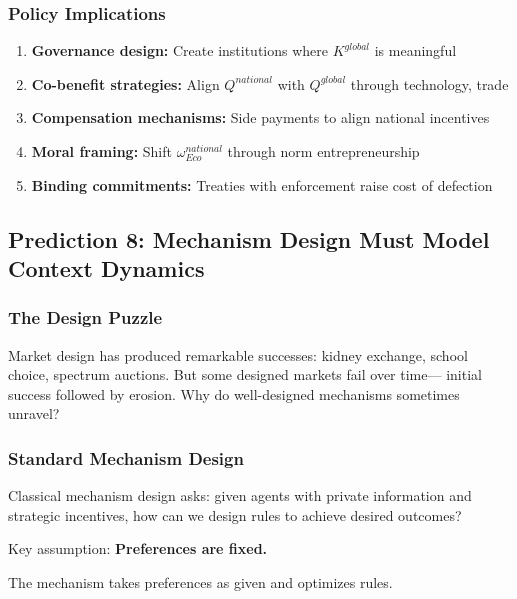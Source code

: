 \subsubsection{Policy Implications}

\begin{enumerate}
  \item \textbf{Governance design:} Create institutions where $K^{global}$ is meaningful
  \item \textbf{Co-benefit strategies:} Align $Q^{national}$ with $Q^{global}$ through technology, trade
  \item \textbf{Compensation mechanisms:} Side payments to align national incentives
  \item \textbf{Moral framing:} Shift $\omega_{Eco}^{national}$ through norm entrepreneurship
  \item \textbf{Binding commitments:} Treaties with enforcement raise cost of defection
\end{enumerate}

\subsection{Prediction 8: Mechanism Design Must Model Context Dynamics}
\label{subsec:pred-mechanism}

\subsubsection{The Design Puzzle}

Market design has produced remarkable successes: kidney exchange, school 
choice, spectrum auctions. But some designed markets fail over time---
initial success followed by erosion. Why do well-designed mechanisms 
sometimes unravel?

\subsubsection{Standard Mechanism Design}

Classical mechanism design \citep{hurwicz1960, myerson1981, maskin1999} asks:
given agents with private information and strategic incentives, how can we 
design rules to achieve desired outcomes?

Key assumption: \textbf{Preferences are fixed.}

The mechanism takes preferences as given and optimizes rules.

